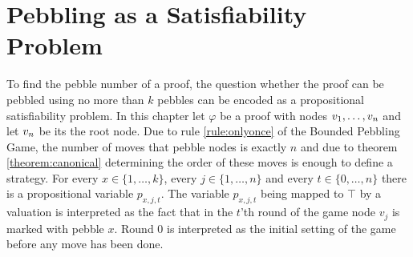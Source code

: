 \section{Pebbling as a Satisfiability Problem}
\label{sec:pebblingSAT}

To find the pebble number of a proof, the question whether the proof can be pebbled using no more than $k$ pebbles can be encoded as a propositional satisfiability problem.
In this chapter let $\varphi$ be a proof with nodes $v_1,\ldots,v_n$ and let $v_n$ be its the root node. 
Due to rule \ref{rule:onlyonce} of the Bounded Pebbling Game, the number of moves that pebble nodes is exactly $n$ and due to theorem \ref{theorem:canonical} determining the order of these moves is enough to define a strategy. 
For every $x \in \{1,\ldots,k\}$, every $j \in \{1,\ldots,n\}$ and every $t \in \{0,\ldots,n\}$ there is a propositional variable $p_{x,j,t}$. 
The variable $p_{x,j,t}$ being mapped to $\top$ by a valuation is interpreted as the fact that in the $t$'th round of the game node $v_j$ is marked with pebble $x$.
Round $0$ is interpreted as the initial setting of the game before any move has been done.
